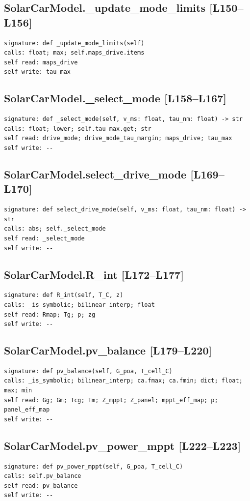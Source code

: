\documentclass[a4paper,10pt,oneside]{book}
\begin{document}
\subsection*{SolarCarModel.\_update\_mode\_limits [L150--L156]}
\begin{lstlisting}[numbers=none]
signature: def _update_mode_limits(self)
calls: float; max; self.maps_drive.items
self read: maps_drive
self write: tau_max
\end{lstlisting}
\subsection*{SolarCarModel.\_select\_mode [L158--L167]}
\begin{lstlisting}[numbers=none]
signature: def _select_mode(self, v_ms: float, tau_nm: float) -> str
calls: float; lower; self.tau_max.get; str
self read: drive_mode; drive_mode_tau_margin; maps_drive; tau_max
self write: --
\end{lstlisting}
\subsection*{SolarCarModel.select\_drive\_mode [L169--L170]}
\begin{lstlisting}[numbers=none]
signature: def select_drive_mode(self, v_ms: float, tau_nm: float) -> str
calls: abs; self._select_mode
self read: _select_mode
self write: --
\end{lstlisting}
\subsection*{SolarCarModel.R\_int [L172--L177]}
\begin{lstlisting}[numbers=none]
signature: def R_int(self, T_C, z)
calls: _is_symbolic; bilinear_interp; float
self read: Rmap; Tg; p; zg
self write: --
\end{lstlisting}
\subsection*{SolarCarModel.pv\_balance [L179--L220]}
\begin{lstlisting}[numbers=none]
signature: def pv_balance(self, G_poa, T_cell_C)
calls: _is_symbolic; bilinear_interp; ca.fmax; ca.fmin; dict; float; max; min
self read: Gg; Gm; Tcg; Tm; Z_mppt; Z_panel; mppt_eff_map; p; panel_eff_map
self write: --
\end{lstlisting}
\subsection*{SolarCarModel.pv\_power\_mppt [L222--L223]}
\begin{lstlisting}[numbers=none]
signature: def pv_power_mppt(self, G_poa, T_cell_C)
calls: self.pv_balance
self read: pv_balance
self write: --
\end{lstlisting}
\end{document}
